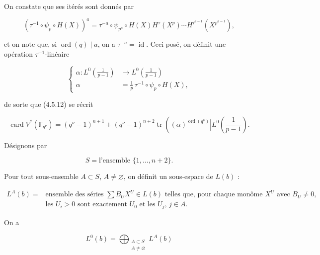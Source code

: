 On constate que ses itérés sont donnés par

\begin{equation}\tag{5.4.14}
(\tau^{-1}\circ\psi_p\circ H(X))^a
=\tau^{-a}\circ\psi_{p^a}\circ
H(X)H^\tau(X^p)\cdots H^{\tau^{a-1}}(X^{p^{a-1}}),
\end{equation}

et on note que, si $\operatorname{ord}(q)\mid a$, on a
$\tau^{-a}=\operatorname{id}$. Ceci posé, on définit une opération
$\tau^{-1}$-linéaire

\begin{equation}\tag{4.5.15}
\left\{
\begin{aligned}
\alpha:L^0\!\left(\frac1{p-1}\right)
&\longrightarrow L^0\!\left(\frac1{p-1}\right)\\
\alpha&=\frac1p\,\tau^{-1}\circ\psi_p\circ H(X),
\end{aligned}
\right.
\end{equation}

de sorte que (4.5.12) se récrit

\begin{equation}\tag{4.5.16}
\operatorname{card}V^*(\mathbb F_{q^\nu})
=(q^\nu-1)^{n+1}
+(q^\nu-1)^{n+2}
\operatorname{tr}\!\left(
\left.(\alpha)^{\operatorname{ord}(q^\nu)}
\right|L^0\!\left(\frac1{p-1}\right)\right..
\end{equation}

Désignons par

\begin{equation}\tag{4.5.17}
S=\text{l'ensemble }\{1,\ldots,n+2\}.
\end{equation}

Pour tout sous-ensemble $A\subset S$, $A\ne\varnothing$, on définit un
sous-espace de $L(b)$ :

\begin{equation}\tag{4.5.18}
\begin{aligned}
L^A(b)={}&\text{ensemble des séries $\sum B_UX^U\in L(b)$ telles que, pour chaque
monôme $X^U$ avec $B_U\ne0$,}\\
&\text{les $U_i>0$ sont exactement $U_0$ et les $U_j$, $j\in A$}.
\end{aligned}
\end{equation}

On a

\begin{equation}\tag{4.5.19}
L^0(b)=\bigoplus_{\substack{A\subset S\\A\ne\varnothing}}L^A(b)
\end{equation}

